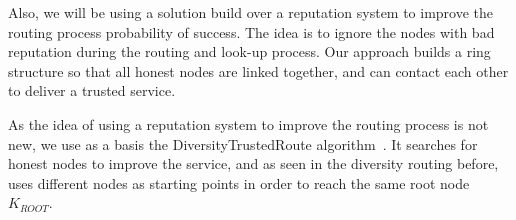 

Also, we will be using a solution build over a reputation system to improve the
routing process probability of success. The idea is to ignore the nodes with
bad reputation during the routing and look-up process.
Our approach builds a ring structure so that all honest nodes are
linked together, and can contact each other to deliver a trusted
service.




As the idea of using a reputation system to improve the routing process is not
new, we use as a basis the DiversityTrustedRoute
algorithm~\cite{rosas2011corps}.
It searches for honest nodes to improve the service, and as seen in the
diversity routing before, uses different nodes as starting points in order to
reach the same root node $K_{ROOT}$.

